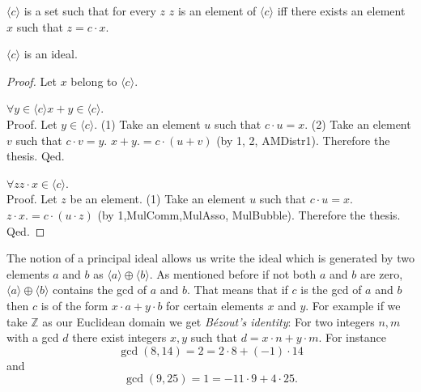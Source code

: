 \documentclass{article}
\newcommand{\Int}{\mathbb{Z}}
\begin{document}
  \begin{forthel}
    \begin{definition}[DefPrIdeal]
      $\langle c \rangle$ is a set such that for every $z$ $z$ is an element of $\langle c \rangle$ iff there exists an element $x$ such that $z = c \cdot x$.
    \end{definition}

    \begin{lemma}[PrIdeal]
      $\langle c \rangle$ is an ideal.
    \end{lemma}
    \begin{proof}
      Let $x$ belong to $\langle c \rangle$.

      $\forall y \in \langle c \rangle x + y \in \langle c \rangle$. \\
      Proof.
        Let $y \in \langle c \rangle$.
        (1) Take an element $u$ such that $c \cdot u = x$.
        (2) Take an element $v$ such that $c \cdot v = y$.
        $x + y .= c \cdot (u + v)$ (by 1, 2, AMDistr1). Therefore the thesis.
      Qed.

      $\forall z z \cdot x \in \langle c \rangle$. \\
      Proof.
        Let $z$ be an element.
        (1) Take an element $u$ such that $c \cdot u = x$.
        $z \cdot x .= c \cdot (u \cdot z)$ (by 1,MulComm,MulAsso, MulBubble). Therefore the thesis.
      Qed.
    \end{proof}
  \end{forthel}

  The notion of a principal ideal allows us write the ideal which is generated by two elements $a$ and $b$ as $\langle a \rangle \oplus \langle b \rangle$. As mentioned before if not both $a$ and $b$ are zero, $\langle a \rangle \oplus \langle b \rangle$ contains the gcd of $a$ and $b$. That means that if $c$ is the gcd of $a$ and $b$ then $c$ is of the form $x \cdot a + y \cdot b$ for certain elements $x$ and $y$. For example if we take $\Int$ as our Euclidean domain we get \textit{Bézout's identity}: For two integers $n,m$ with a gcd $d$ there exist integers $x,y$ such that $d = x \cdot n + y \cdot m$. For instance
  $$\gcd(8,14) = 2 = 2 \cdot 8 + (-1) \cdot 14$$
  and
  $$\gcd(9,25) = 1 = -11 \cdot 9 + 4 \cdot 25.$$
\end{document}
